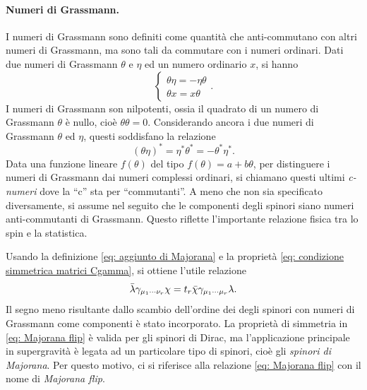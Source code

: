 \paragraph{Numeri di Grassmann.} I numeri di Grassmann sono definiti come quantità che anti-commutano con altri numeri di Grassmann, ma sono tali da commutare con i numeri ordinari. Dati due numeri di Grassmann $\theta$ e $\eta$ ed un numero ordinario $x$, si hanno
\begin{equation}
    \begin{cases}
        \theta\eta = -\eta\theta \\
        \theta x = x\theta
    \end{cases}.
\end{equation}
I numeri di Grassmann son nilpotenti, ossia
il quadrato di un numero di Grassmann $\theta$ è nullo, cioè $\theta\theta = 0$. Considerando ancora i due numeri di Grassmann $\theta$ ed $\eta$, questi soddisfano la relazione
\begin{equation}
    (\theta\eta)^* = \eta^*\theta^* = -\theta^*\eta^*.
\end{equation}
Data una funzione lineare $f(\theta)$ del tipo $f(\theta) = a + b\theta$, per distinguere i numeri di Grassmann dai numeri complessi ordinari, si chiamano questi ultimi \emph{c-numeri} dove la ``c'' sta per ``commutanti''. A meno che non sia specificato diversamente, si assume nel seguito che le componenti degli spinori siano numeri anti-commutanti di Grassmann. Questo riflette l'importante relazione fisica tra lo spin e la statistica.

Usando la definizione \eqref{eq: aggiunto di Majorana} e la proprietà \eqref{eq: condizione simmetrica matrici Cgamma}, si ottiene l'utile relazione
\begin{equation}
\label{eq: Majorana flip}
    \bar{\lambda}\gamma_{\mu_1\cdots\nu_r}\chi = t_r\bar{\chi}\gamma_{\mu_1\cdots\mu_r}\lambda.
\end{equation}
Il segno meno risultante dallo scambio dell'ordine dei degli spinori con numeri di Grassmann come componenti è stato incorporato. La proprietà di simmetria in \eqref{eq: Majorana flip} è valida per gli spinori di Dirac, ma l'applicazione principale in supergravità è legata ad un particolare tipo di spinori, cioè gli \emph{spinori di Majorana}. Per questo motivo, ci si riferisce alla relazione \eqref{eq: Majorana flip} con il nome di \emph{Majorana flip}. 

